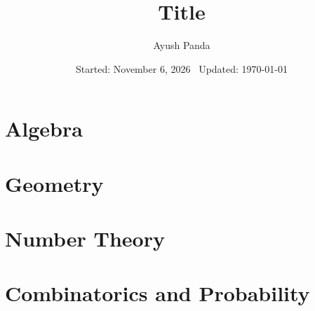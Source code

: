 \documentclass[11pt]{book}
\title{Title}
\author{Ayush Panda}
\date{Started: November 6, 2026 \textbar\ Updated: \today}
\begin{document}
\maketitle
\tableofcontents

\part{Algebra}


\part{Geometry}

\part{Number Theory}

\part{Combinatorics and Probability}
\end{document}
